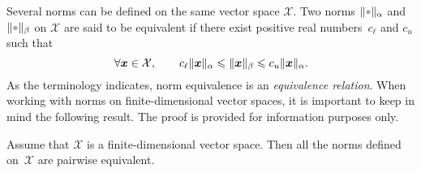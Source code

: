 Several norms can be defined on the same vector space $\mathcal X$.
Two norms $\norm{\placeholder}_{\alpha}$ and $\norm{\placeholder}_{\beta}$ on $\mathcal X$ are said to be equivalent if
there exist positive real numbers~$c_{\ell}$ and $c_u$ such that
\begin{equation}
    \label{eq:norm_equilavence}
    \forall \mathbf{\boldsymbol{x}} \in \mathcal X,
    \qquad c_{\ell} \lVert\mathbf{\boldsymbol{x}}\rVert_{\alpha}
    \leqslant \lVert\mathbf{\boldsymbol{x}}\rVert_{\beta}
    \leqslant c_u \lVert\mathbf{\boldsymbol{x}}\rVert_{\alpha}.
\end{equation}
As the terminology indicates, norm equivalence is an \emph{equivalence relation}.
When working with norms on finite-dimensional vector spaces,
it is important to keep in mind the following result.
The proof is provided for information purposes only.
\begin{proposition}
    Assume that $\mathcal X$ is a finite-dimensional vector space.
    Then all the norms defined on~$\mathcal X$ are pairwise equivalent.
\end{proposition}

